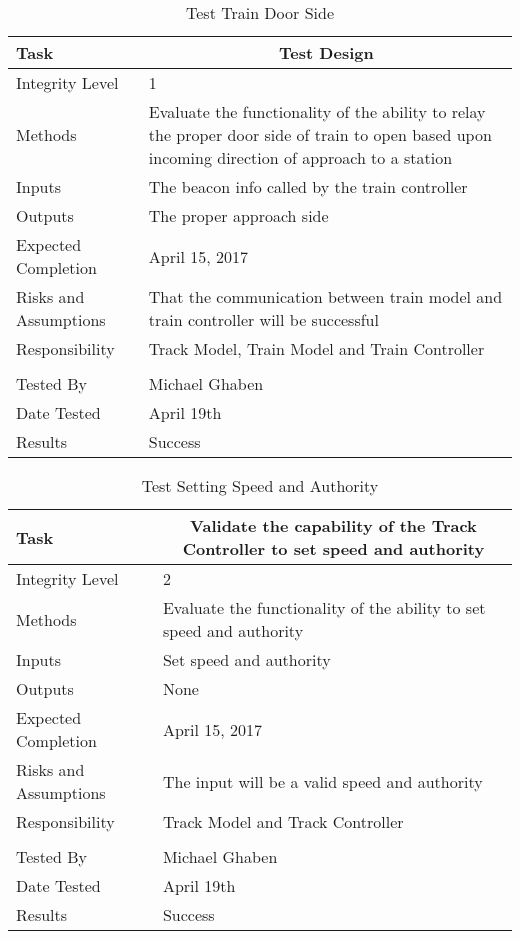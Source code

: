 \documentclass[]{article}
\begin{document}
\begin{table}[H]
	\centering
	\caption{Test Train Door Side}
	\begin{tabular}{|l|l|}
		\hline
		Task & \multicolumn{1}{c|}{Test Design} \\ \hline
		Integrity Level & 1 \\ \hline
		Methods &  \parbox[t]{10cm}{Evaluate the functionality of the ability to relay the proper door side of train to open based upon incoming direction of approach to a station} \\ \hline
		Inputs &  The beacon info called by the train controller \\ \hline
		Outputs &  \parbox[t]{10cm}{The proper approach side}\\ \hline
		Expected Completion & April 15, 2017\\ \hline
		Risks and Assumptions & \parbox[t]{10cm}{That the communication between train model and train controller will be successful} \\ \hline
		Responsibility & Track Model, Train Model and Train Controller\\ \hline
		\\ \hline
		Tested By   &  Michael Ghaben\\	\hline
		Date Tested & \parbox[t]{10cm}{April 19th}\\ \hline
		Results & Success\\ \hline
	\end{tabular}
\end{table}

\begin{table}[H]
	\centering
	\caption{Test Setting Speed and Authority}
	\begin{tabular}{|l|l|}
		\hline
		Task & \multicolumn{1}{c|}{Validate the capability of the Track Controller to set speed and authority} \\ \hline
		Integrity Level & 2\\ \hline
		Methods & Evaluate the functionality of the ability to set speed and authority \\ \hline
		Inputs &  Set speed and authority\\ \hline
		Outputs &  \parbox[t]{10cm}{None}\\ \hline
		Expected Completion & April 15, 2017\\ \hline
		Risks and Assumptions & The input will be a valid speed and authority \\ \hline
		Responsibility & Track Model and Track Controller\\ \hline
		\\ \hline
		Tested By   &  Michael Ghaben\\	\hline
		Date Tested & \parbox[t]{10cm}{April 19th}\\ \hline
		Results & Success\\ \hline
	\end{tabular}
\end{table}
\end{document}
